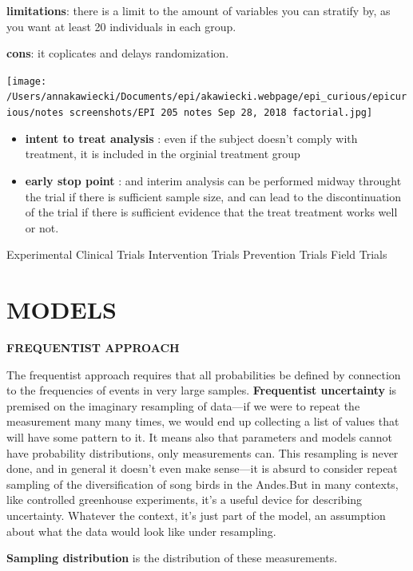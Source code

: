 \documentclass[
]{article}
\begin{document}
\textbf{limitations}: there is a limit to the amount of variables you
can stratify by, as you want at least 20 individuals in each group.

\textbf{cons}: it coplicates and delays randomization.

\texttt{[image: /Users/annakawiecki/Documents/epi/akawiecki.webpage/epi\_curious/epicurious/notes screenshots/EPI 205 notes Sep 28, 2018 factorial.jpg]}

\begin{itemize}
\item
  \textbf{intent to treat analysis} : even if the subject doesn't comply
  with treatment, it is included in the orginial treatment group
\item
  \textbf{early stop point} : and interim analysis can be performed
  midway throught the trial if there is sufficient sample size, and can
  lead to the discontinuation of the trial if there is sufficient
  evidence that the treat treatment works well or not.
\end{itemize}

Experimental Clinical Trials Intervention Trials Prevention Trials Field
Trials

\hypertarget{models}{%
\section{\texorpdfstring{\textbf{MODELS}}{MODELS}}\label{models}}

\textbf{FREQUENTIST APPROACH}

The frequentist approach requires that all probabilities be defined by
connection to the frequencies of events in very large samples.
\textbf{Frequentist uncertainty} is premised on the imaginary resampling
of data---if we were to repeat the measurement many many times, we would
end up collecting a list of values that will have some pattern to it. It
means also that parameters and models cannot have probability
distributions, only measurements can. This resampling is never done, and
in general it doesn't even make sense---it is absurd to consider repeat
sampling of the diversification of song birds in the Andes.But in many
contexts, like controlled greenhouse experiments, it's a useful device
for describing uncertainty. Whatever the context, it's just part of the
model, an assumption about what the data would look like under
resampling.

\textbf{Sampling distribution} is the distribution of these
measurements.
\end{document}
